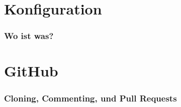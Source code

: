 \documentclass{cms-kurs}
\begin{document}
\section{Konfiguration}

\begin{frame}
  \frametitle{Wo ist was?}

  \onslide<+->


\end{frame}

\section{GitHub}

\begin{frame}
  \frametitle{Cloning, Commenting, und Pull Requests}

  \onslide<+->


\end{frame}
\end{document}
